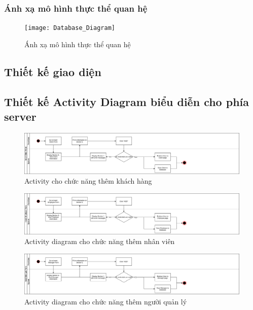 \documentclass{article}
\begin{document}
\subsubsection{Ánh xạ mô hình thực thể quan hệ}

\begin{figure}[H]
\centering
\texttt{[image: Database\_Diagram]}
\caption{Ánh xạ mô hình thực thể quan hệ}
\end{figure}

\subsection{Thiết kế giao diện}

\subsection{Thiết kế Activity Diagram biểu diễn cho phía server}
\begin{figure}[H]
\centering
\includegraphics[scale=0.4]{themkhachhang}
\caption{Activity cho chức năng thêm khách hàng}
\end{figure}

\begin{figure}[H]
\centering
\includegraphics[scale=0.4]{themnhanvien}
\caption{Activity diagram cho chức năng thêm nhân viên}
\end{figure}

\begin{figure}[H]
\centering
\includegraphics[scale=0.4]{themquanli}
\caption{Activity diagram cho chức năng thêm người quản lý}
\end{figure}
\end{document}
